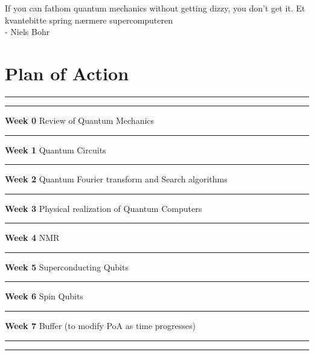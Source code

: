 \documentclass{package/notes}
\newcommand{\0}{\ket{0}}
\newcommand{\1}{\ket{1}}
\begin{document}
\begin{titlepage}
{\large If you can fathom quantum mechanics without getting dizzy, you don't get it. Et kvantebitte spring nærmere supercomputeren\\ - Niels Bohr}
\end{titlepage}

\newpage


\tableofcontents

\chapter{Plan of Action}
\hrule
\vspace{5mm}
\hrule
\vspace{5mm}
\begin{gitemize}
\item \Large{\textbf{Week 0}}
\qquad
Review of Quantum Mechanics
\vspace{5mm}
\hrule
\vspace{5mm}
\item \Large{\textbf{Week 1}}
\qquad
Quantum Circuits
\vspace{5mm}
\hrule
\vspace{5mm}
\item \Large{\textbf{Week 2}}
\qquad
Quantum Fourier transform and Search algorithms
\vspace{5mm}
\hrule
\vspace{5mm}
\item \Large{\textbf{Week 3}}
\qquad
Physical realization of Quantum Computers
\vspace{5mm}
\hrule
\vspace{5mm}
\item \Large{\textbf{Week 4}}
\qquad
NMR
\vspace{5mm}
\hrule
\vspace{5mm}
\item \Large{\textbf{Week 5}}
\qquad
Superconducting Qubits
\vspace{5mm}
\hrule
\vspace{5mm}
\item \Large{\textbf{Week 6}}
\qquad
Spin Qubits
\vspace{5mm}
\hrule
\vspace{5mm}
\item \Large{\textbf{Week 7}}
\qquad
Buffer (to modify PoA as time progresses)
\vspace{5mm}
\hrule
\vspace{5mm}
\hrule
\end{gitemize}
\end{document}
